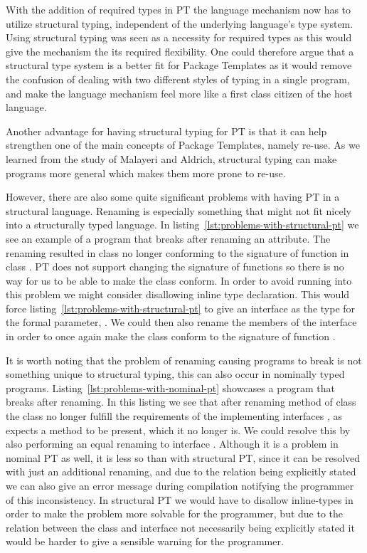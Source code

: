 With the addition of required types in PT the language mechanism now has to utilize structural typing, independent of the underlying language's type system.
Using structural typing was seen as a necessity for required types as this would give the mechanism the its required flexibility.
One could therefore argue that a structural type system is a better fit for Package Templates as it would remove the confusion of dealing with two different styles of typing in a single program, and make the language mechanism feel more like a first class citizen of the host language.

Another advantage for having structural typing for PT is that it can help strengthen one of the main concepts of Package Templates, namely re-use.
As we learned from the study of Malayeri and Aldrich, structural typing can make programs more general which makes them more prone to re-use.

However, there are also some quite significant problems with having PT in a structural language.
Renaming is especially something that might not fit nicely into a structurally typed language.
In listing~\vref{lst:problems-with-structural-pt} we see an example of a program that breaks after renaming an attribute.
The renaming resulted in class  no longer conforming to the signature of function  in class .
PT does not support changing the signature of functions so there is no way for us to be able to make the  class conform.
In order to avoid running into this problem we might consider disallowing inline type declaration.
This would force listing~\vref{lst:problems-with-structural-pt} to give an interface as the type for the formal parameter, .
We could then also rename the members of the interface in order to once again make the  class conform to the signature of function .

It is worth noting that the problem of renaming causing programs to break is not something unique to structural typing, this can also occur in nominally typed programs.
Listing~\vref{lst:problems-with-nominal-pt} showcases a program that breaks after renaming.
In this listing we see that after renaming method  of class  the class no longer fulfill the requirements of the implementing interfaces , as  expects a method  to be present, which it no longer is.
We could resolve this by also performing an equal renaming to interface .
Although it is a problem in nominal PT as well, it is less so than with structural PT, since it can be resolved with just an additional renaming, and due to the relation being explicitly stated we can also give an error message during compilation notifying the programmer of this inconsistency.
In structural PT we would have to disallow inline-types in order to make the problem more solvable for the programmer, but due to the relation between the class and interface not necessarily being explicitly stated it would be harder to give a sensible warning for the programmer.

